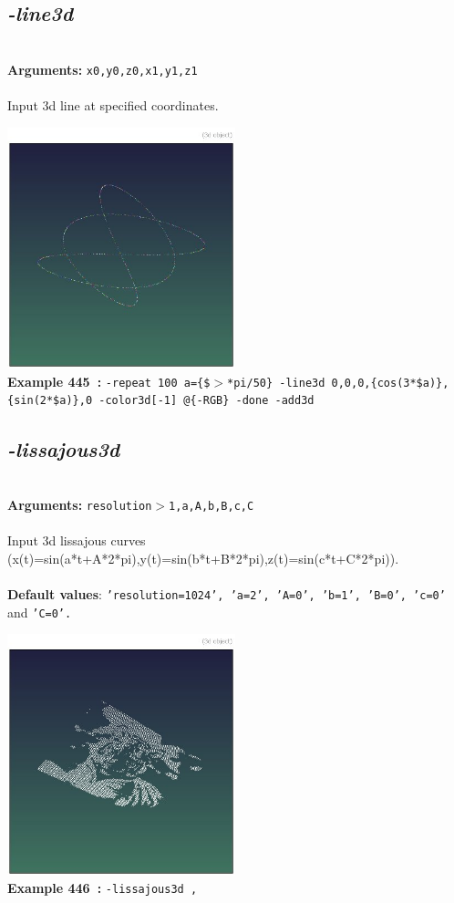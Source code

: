 \documentclass[a4paper,11pt,twoside]{book}
\begin{document}
\subsection{\emph{-line3d} }\vspace*{-0.5em}
~\\\textbf{Arguments: } 
{\small \texttt{x0,y0,z0,x1,y1,z1}}\\~\\
Input 3d line at specified coordinates.
\begin{center}\includegraphics[keepaspectratio=true,height=7cm,width=\textwidth]{img/gmic_def445.jpg}\\
{\footnotesize \textbf{Example 445~:} \texttt{-repeat 100 a=\{\$$>$*pi/50\} -line3d 0,0,0,\{cos(3*\$a)\},\{sin(2*\$a)\},0 -color3d[-1] @\{-RGB\} -done -add3d}}
\end{center}

\subsection{\emph{-lissajous3d} }\vspace*{-0.5em}
~\\\textbf{Arguments: } 
{\small \texttt{resolution$>$1,a,A,b,B,c,C}}\\~\\
Input 3d lissajous curves (x(t)=sin(a*t+A*2*pi),y(t)=sin(b*t+B*2*pi),z(t)=sin(c*t+C*2*pi)).
~\\~\\\textbf{Default values}: {\small \texttt{'resolution=1024', 'a=2', 'A=0', 'b=1', 'B=0', 'c=0'} and \texttt{'C=0'.}}
\begin{center}\includegraphics[keepaspectratio=true,height=7cm,width=\textwidth]{img/gmic_def446.jpg}\\
{\footnotesize \textbf{Example 446~:} \texttt{-lissajous3d ,}}
\end{center}
\end{document}

